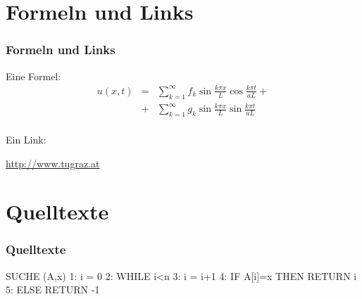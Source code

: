 \documentclass{beamer}
\begin{document}
\section{Formeln und Links}
\begin{frame}
	\frametitle{Formeln und Links}
	Eine Formel:
	\begin{eqnarray*}
	u(x,t) & = & \sum_{k=1}^{\infty} f_k \sin \frac{k \pi x}{L} \cos 
				 \frac{k \pi t}{aL} + \\
		   & + & \sum_{k=1}^{\infty} g_k \sin \frac{k \pi x}{L} \sin 
				 \frac{k \pi t}{aL} \\
	\end{eqnarray*}

	Ein Link:
	\begin{center}
		\url{http://www.tugraz.at}		
	\end{center}
\end{frame}

\section{Quelltexte}
\begin{frame}[fragile]
	\frametitle{Quelltexte}
	\begin{spacing}{1}
	\begin{semiverbatim}
SUCHE (A,x)
1: i = 0
2: WHILE i<n
3:     i = i+1
4:     \alert{IF A[i]=x THEN RETURN i}
5: ELSE RETURN -1
	\end{semiverbatim}
	\end{spacing}
\end{frame}

\end{document}
